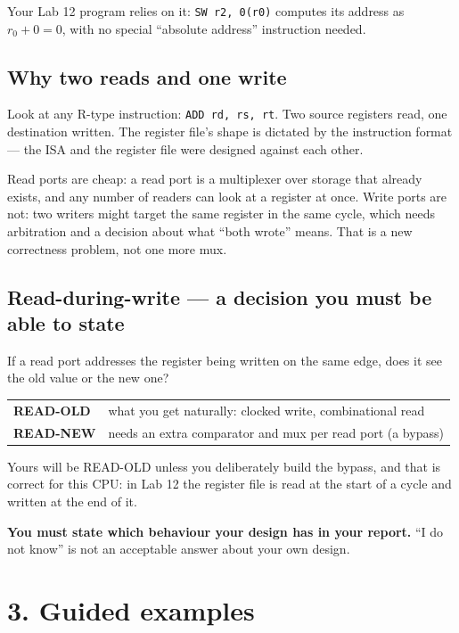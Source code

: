 \documentclass[11pt]{article}
\newcommand{\code}[1]{\texttt{#1}}
\begin{document}
Your Lab 12 program relies on it: \code{SW r2, 0(r0)} computes its address as
$r_0 + 0 = 0$, with no special ``absolute address'' instruction needed.

\subsection*{Why two reads and one write}

Look at any R-type instruction: \code{ADD rd, rs, rt}. Two source registers
read, one destination written. The register file's shape is dictated by the
instruction format --- the ISA and the register file were designed against each
other.

Read ports are cheap: a read port is a multiplexer over storage that already
exists, and any number of readers can look at a register at once. Write ports
are not: two writers might target the same register in the same cycle, which
needs arbitration and a decision about what ``both wrote'' means. That is a new
correctness problem, not one more mux.

\subsection*{Read-during-write --- a decision you must be able to state}

If a read port addresses the register being written on the same edge, does it
see the old value or the new one?

\begin{center}
\begin{tabular}{ll}
\toprule
\textbf{READ-OLD} & what you get naturally: clocked write, combinational read \\
\textbf{READ-NEW} & needs an extra comparator and mux per read port (a bypass) \\
\bottomrule
\end{tabular}
\end{center}

Yours will be READ-OLD unless you deliberately build the bypass, and that is
correct for this CPU: in Lab 12 the register file is read at the start of a
cycle and written at the end of it.

\textbf{You must state which behaviour your design has in your report.}
``I do not know'' is not an acceptable answer about your own design.

\section*{3. Guided examples}
\end{document}
